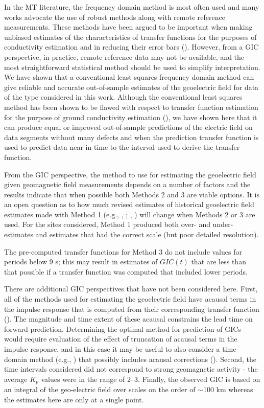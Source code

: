 \documentclass[linenumbers,draft]{agujournal}
\newcommand{\citeay}[1]{%
\citeauthor{#1}, \citeyear{#1}%
}
\begin{document}
In the MT literature, the frequency domain method is most often used and many works advocate the use of robust methods along with remote reference measurements.  These methods have been argued to be important when making unbiased estimates of the characteristics of transfer functions for the purposes of conductivity estimation and in reducing their error bars (\cite{Chave2012}).  However, from a GIC perspective, in practice, remote reference data may not be available, and the most straightforward statistical method should be used to simplify interpretation.  We have shown that a conventional least squares frequency domain method can give reliable and accurate out-of-sample estimates of the geoelectric field for data of the type considered in this work.  Although the conventional least squares method has been shown to be flawed with respect to transfer function estimation for the purpose of ground conductivity estimation (\cite{Egbert1986}), we have shown here that it can produce equal or improved out-of-sample predictions of the electric field on data segments without many defects and when the prediction transfer function is used to predict data near in time to the interval used to derive the transfer function.

From the GIC perspective, the method to use for estimating the geoelectric field given geomagnetic field measurements depends on a number of factors and the results indicate that when possible both Methods 2 and 3 are viable options.  It is an open question as to how much revised estimates of historical geoelectric field estimates made with Method 1 (e.g., \citeay{Pulkkinen2012}; \citeay{Wei2013}) will change when Methods 2 or 3 are used.  For the sites considered, Method 1 produced both over- and under-estimates and estimates that had the correct scale (but poor detailed resolution).

The pre-computed transfer functions for Method 3 do not include values for periods below 9 s; this may result in estimates of $GIC(t)$ that are less than that possible if a transfer function was computed that included lower periods. 

There are additional GIC perspectives that have not been considered here.  First, all of the methods used for estimating the geoelectric field have acausal terms in the impulse response that is computed from their corresponding transfer function (\cite{Egbert1992}).  The magnitude and time extent of these acausal constrains the lead time on forward prediction.  Determining the optimal method for prediction of GICs would require evaluation of the effect of truncation of acausal terms in the impulse response, and in this case it may be useful to also consider a time domain method (e.g., \cite{McMechan1985}) that possibly includes acausal corrections (\cite{Tzschoppe2009}).  Second, the time intervals considered did not correspond to strong geomagnetic activity - the average $K_p$ values were in the range of 2--3.  Finally, the observed GIC is based on an integral of the geo-electric field over scales on the order of $\sim$100 km whereas the estimates here are only at a single point.
\end{document}
